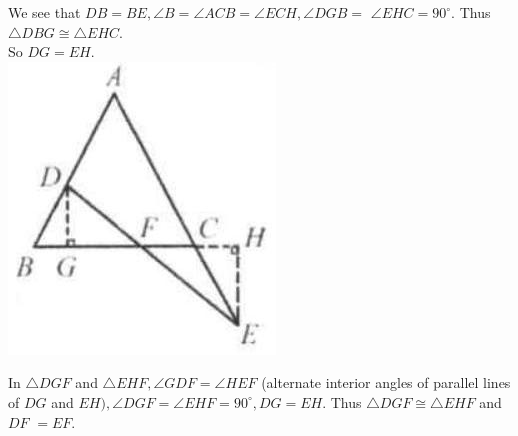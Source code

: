 \documentclass{article}
\begin{document}
We see that \(D B=B E, \angle B=\angle A C B=\angle E C H, \angle D G B=\) \(\angle E H C=90^{\circ}\). Thus \(\triangle D B G \cong \triangle E H C\).\\
So \(D G=E H\).\\
\centering
\includegraphics[width=\textwidth]{images/reasoning_image_1.jpg}


In \(\triangle D G F\) and \(\triangle E H F, \angle G D F=\angle H E F\) (alternate interior angles of parallel lines of \(D G\) and \(E H), \angle D G F=\angle E H F=90^{\circ}, D G=E H\). Thus \(\triangle D G F \cong \triangle E H F\) and \(D F\) \(=E F\).
\end{document}
